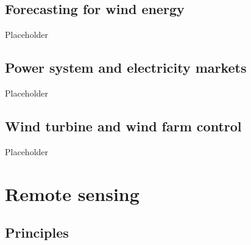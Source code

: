 \clearpage
\subsection{Forecasting for wind energy}
\label{sec:intro_forecasting}

Placeholder


\clearpage
\subsection{Power system and electricity markets}
\label{sec:intro_power_markets}

Placeholder

\clearpage
\subsection{Wind turbine and wind farm control}
\label{sec:intro_control}

Placeholder


\clearpage
\section{Remote sensing}
\label{intro_remote_sensing}

\subsection{Principles}
\label{sec:intro_rs_principles}

